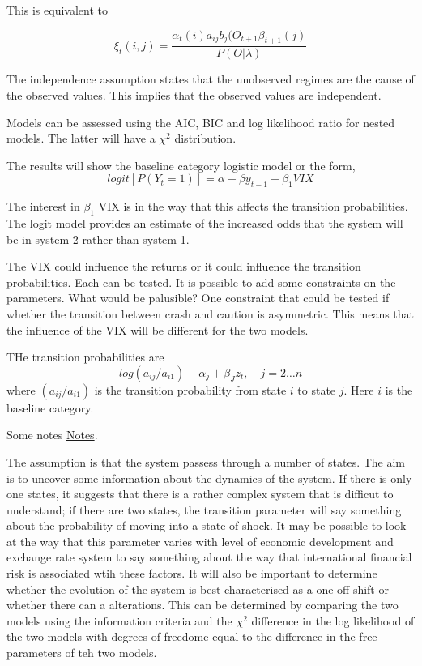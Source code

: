 \documentclass[12pt, a4paper, oneside]{article} %
\begin{document}
This is equivalent to 

\begin{equation}
\xi_t(i,j) = \frac{\alpha_t(i)a_{ij}b_j(O_{t+1}\beta_{t+1}(j)}{P(O|\lambda)}
\end{equation}

The independence assumption states that the unobserved regimes are the cause of the observed values.  This implies that the observed values are independent. 

Models can be assessed using the AIC, BIC and log likelihood ratio for nested models.  The latter will have a $\chi^2$ distribution. 

The results will show the baseline category logistic model or the form, 
\begin{equation} 
logit[P(Y_t = 1)] = \alpha + \beta y_{t-1} + \beta_1 VIX
\end{equation}

The interest in $\beta_1$ VIX is in the way that this affects the transition probabilities.  The logit model provides an estimate of the increased odds that the system will be in system 2 rather than system 1.

The VIX could influence the returns or it could influence the transition probabilities.  Each can be tested. It is possible to add some constraints on the parameters.  What would be palusible? One constraint that could be tested if whether the transition between crash and caution is asymmetric.  This means that the influence of the VIX will be different for the two models.  

THe transition probabilities are
\begin{equation}
log(a_{ij}/a_{i1}) - \alpha_j +\beta_J z_t, \quad j = 2\dots n
\end{equation} 
where $(a_{ij}/a_{i1})$ is the transition probability from state $i$ to state $j$.  Here $i$ is the baseline category. 

Some notes \href{https://onlinecourses.science.psu.edu/stat504/node/174}{Notes}.

The assumption is that the system passess through a number of states.  The aim is to uncover some information about the dynamics of the system.  If there is only one states,  it suggests that there is a rather complex system that is difficut to understand; if there are two states, the transition parameter will say something about the probability of moving into a state of shock.  It may be possible to look at the way that this parameter varies with level of economic development and exchange rate system to say something about the way that international financial risk is associated wtih these factors.  It will also be important to determine whether the evolution of the system is best characterised as a one-off shift or whether there can a alterations.  This can be determined by comparing the two models using the information criteria and the $\chi^2$ difference in the log likelihood of the two models with degrees of freedome equal to the difference in the free parameters of teh two models. 
\end{document}
